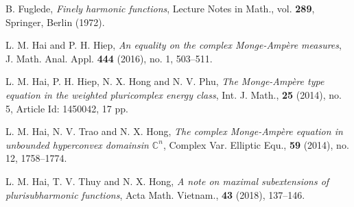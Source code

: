\documentclass[3p,times]{elsarticle}
\numberwithin{equation}{section}
\newtheorem{The main theorem}[theorem]{The main theorem}
\theoremstyle{definition}
\begin{document}
\begin{thebibliography}{00}
 B. Fuglede, {\em  Finely harmonic functions}, Lecture Notes in Math., vol. {\bf289}, Springer, Berlin (1972).






  L. M. Hai and P. H. Hiep, {\em   An equality on the complex Monge-Amp\`ere measures},  J. Math. Anal. Appl. {\bf 444} (2016), no. 1, 503--511.

\bibitem{} L. M. Hai, P. H. Hiep, N. X. Hong and N. V. Phu, {\em The Monge-Amp\`{e}re type equation in the weighted pluricomplex energy class}, Int. J. Math., {\bf 25} (2014), no. 5, Article Id: 1450042, 17 pp.

   L. M. Hai, N. V. Trao and N. X. Hong, {\em The complex Monge-Amp\`{e}re equation in unbounded hyperconvex domainsin $\mathbb C^n$}, Complex Var. Elliptic Equ., {\bf 59} (2014),  no. 12,  1758--1774.


 

 




\bibitem{}  L. M. Hai, T. V. Thuy and N. X. Hong, {\em  A note on  maximal subextensions  of plurisubharmonic functions},  Acta Math. Vietnam., {\bf 43} (2018), 137--146.

 


\end{thebibliography}
\end{document}
